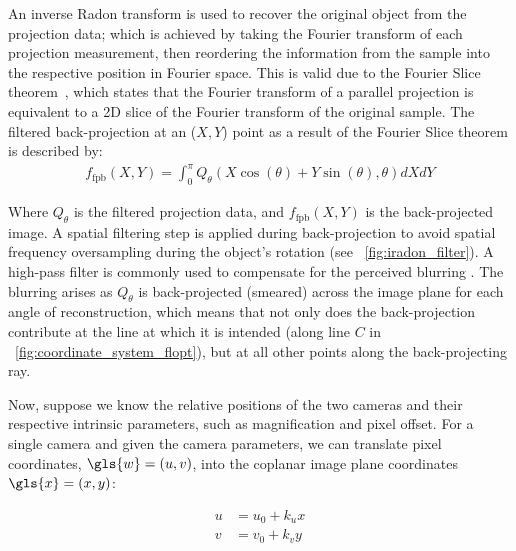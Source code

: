 An inverse \gls{Radon transform} is used to recover the original object from the projection data; which is achieved by taking the \gls{Fourier transform} of each projection measurement, then reordering the information from the sample into the respective position in Fourier space.
This is valid due to the Fourier Slice theorem~\cite{bracewellStripIntegrationRadio1956}, which states that the \gls{Fourier transform} of a parallel projection is equivalent to a 2D slice of the Fourier transform of the original sample. The filtered back-projection at an (\(X,Y\)) point as a result of the Fourier Slice theorem is described by:
\begin{align}
f_{\text{fpb}}(X,Y) = \int_{0}^{\pi} Q_\theta (X\cos(\theta)+Y\sin(\theta),\theta)dXdY
\end{align}

Where \(Q_\theta \) is the filtered projection data, and \(f_{\text{fpb}}(X,Y)\) is the back-projected image.
A spatial filtering step is applied during back-projection to avoid spatial frequency oversampling during the object’s rotation (see \figurename~\ref{fig:iradon_filter}).
A high-pass filter is commonly used to compensate for the perceived blurring \cite{?}.
The blurring arises as \(Q_\theta \) is back-projected (smeared) across the image plane for each angle of reconstruction, which means that not only does the back-projection contribute at the line at which it is intended (along line \(C\) in \figurename~\ref{fig:coordinate_system_flopt}), but at all other points along the back-projecting ray.


Now, suppose we know the relative positions of the two cameras and their respective intrinsic parameters, such as magnification and pixel offset.
For a single camera and given the camera parameters, we can translate pixel coordinates, \(\gls{w} = (u, v)\), into the coplanar image plane coordinates \(\gls{x}=(x, y)\):

\begin{align}
    u &= u_0 + k_u x \\
    v &= v_0 + k_v y
\end{align}

